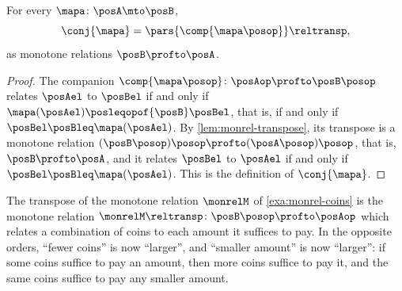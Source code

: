 \begin{lemma}
    \label{lem:conjoint-via-transpose}
    For every  $\mapa \colon \posA \mto \posB$,
    \begin{equation}
        \conj{\mapa} = \pars{\comp{\mapa\posop}}\reltransp,
    \end{equation}
    as monotone relations $\posB \profto \posA$.
\end{lemma}
\begin{proof}
    The companion $\comp{\mapa\posop} \colon \posAop \profto \posB\posop$ relates $\posAel$ to $\posBel$ if and only if $\mapa(\posAel) \posleqopof{\posB} \posBel$, that is, if and only if $\posBel \posBleq \mapa(\posAel)$.
    By \cref{lem:monrel-transpose}, its transpose is a monotone relation $(\posB\posop)\posop \profto (\posA\posop)\posop$, that is, $\posB \profto \posA$, and it relates $\posBel$ to $\posAel$ if and only if $\posBel \posBleq \mapa(\posAel)$.
    This is the definition of $\conj{\mapa}$.
\end{proof}

\begin{example}
    The transpose of the monotone relation $\monrelM$ of \cref{exa:monrel-coins} is the monotone relation $\monrelM\reltransp \colon \posB\posop \profto \posAop$ which relates a combination of coins to each amount it suffices to pay.
    In the opposite orders, ``fewer coins'' is now ``larger'', and ``smaller amount'' is now ``larger'': if some coins suffice to pay an amount, then more coins suffice to pay it, and the same coins suffice to pay any smaller amount.
\end{example}


